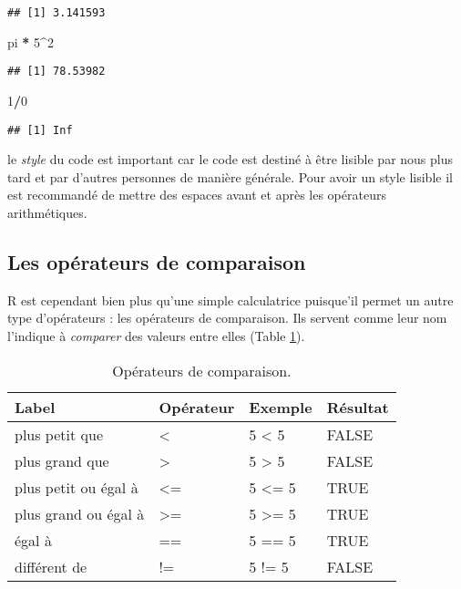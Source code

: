 \documentclass[]{book}
\newenvironment{Shaded}{\begin{snugshade}}{\end{snugshade}}
\newcommand{\DecValTok}[1]{\textcolor[rgb]{0.00,0.00,0.81}{#1}}
\newcommand{\StringTok}[1]{\textcolor[rgb]{0.31,0.60,0.02}{#1}}
\newcommand{\OperatorTok}[1]{\textcolor[rgb]{0.81,0.36,0.00}{\textbf{#1}}}
\newcommand{\NormalTok}[1]{#1}
\theoremstyle{definition}
\theoremstyle{definition}
\theoremstyle{definition}
\theoremstyle{remark}
\begin{document}
\begin{verbatim}
## [1] 3.141593
\end{verbatim}

\begin{Shaded}
\begin{Highlighting}[]
\NormalTok{pi }\OperatorTok{*}\StringTok{ }\DecValTok{5}\OperatorTok{^}\DecValTok{2}
\end{Highlighting}
\end{Shaded}

\begin{verbatim}
## [1] 78.53982
\end{verbatim}

\begin{Shaded}
\begin{Highlighting}[]
\DecValTok{1}\OperatorTok{/}\DecValTok{0}
\end{Highlighting}
\end{Shaded}

\begin{verbatim}
## [1] Inf
\end{verbatim}

le \emph{style} du code est important car le code est destiné à être
lisible par nous plus tard et par d'autres personnes de manière
générale. Pour avoir un style lisible il est recommandé de mettre des
espaces avant et après les opérateurs arithmétiques.

\hypertarget{l011opcomp}{\subsection{Les opérateurs de
comparaison}\label{l011opcomp}}

R est cependant bien plus qu'une simple calculatrice puisque'il permet
un autre type d'opérateurs : les opérateurs de comparaison. Ils servent
comme leur nom l'indique à \emph{comparer} des valeurs entre elles
(Table \ref{tab:tabOpCom}).

\begin{table}

\caption{\label{tab:tabOpCom}Opérateurs de comparaison.\label{tab:tabOpCom}}
\centering
\begin{tabular}[t]{l|l|l|l}
\hline
Label & Opérateur & Exemple & Résultat\\
\hline
plus petit que & < & 5 < 5 & FALSE\\
\hline
plus grand que & > & 5 > 5 & FALSE\\
\hline
plus petit ou égal à & <= & 5 <= 5 & TRUE\\
\hline
plus grand ou égal à & >= & 5 >= 5 & TRUE\\
\hline
égal à & == & 5 == 5 & TRUE\\
\hline
différent de & != & 5 != 5 & FALSE\\
\hline
\end{tabular}
\end{table}
\end{document}
